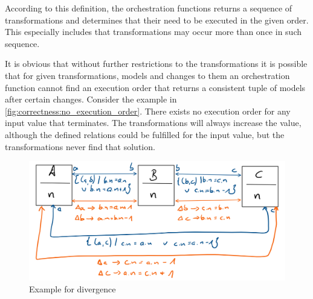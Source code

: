 
According to this definition, the orchestration functions returns a sequence of transformations and determines that their \modellevelconsistencypreservationrules need to be executed in the given order. 
This especially includes that transformations may occur more than once in such sequence.

It is obvious that without further restrictions to the transformations it is possible that for given transformations, models and changes to them an orchestration function cannot find an execution order that returns a consistent tuple of models after certain changes. 
Consider the example in \autoref{fig:correctness:no_execution_order}. There exists no execution order for any input value that terminates. The transformations will always increase the value, although the defined relations could be fulfilled for the input value, but the transformations never find that solution.

\begin{figure}
    \centering
    \includegraphics[width=\textwidth]{figures/correctness/formal/divergence_example.png}
    \caption{Example for divergence}
    \label{fig:correctness:no_execution_order}
\end{figure}

